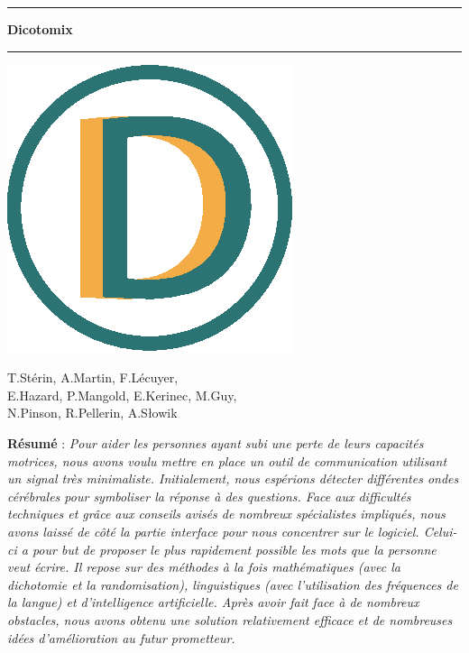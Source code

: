 \documentclass[11pt,a4paper]{article}
\theoremstyle{plain}
\theoremstyle{definition}
\begin{document}
\begin{center}


\vspace{1.5cm}

\rule[11pt]{5cm}{0.5pt}

\textbf{\huge Dicotomix}

\rule{5cm}{0.5pt}
\vspace{0.5cm}

\includegraphics[scale=0.7]{images/icon.eps}

\vspace{0.5cm}

T.Stérin, A.Martin, F.Lécuyer, \\ E.Hazard, P.Mangold, E.Kerinec, M.Guy, \\ N.Pinson, R.Pellerin, A.Słowik

\vspace{1.5cm}

\parbox{15cm}{\small
\textbf{Résumé} : \it Pour aider les personnes ayant subi une perte de leurs capacités motrices, nous avons voulu mettre en place un outil de communication utilisant un signal très minimaliste. Initialement, nous espérions détecter différentes ondes cérébrales pour symboliser la réponse à des questions. Face aux difficultés techniques et grâce aux conseils avisés de nombreux spécialistes impliqués, nous avons laissé de côté la partie interface pour nous concentrer sur le logiciel. Celui-ci a pour but de proposer le plus rapidement possible les mots que la personne veut écrire. Il repose sur des méthodes à la fois mathématiques (avec la dichotomie et la randomisation), linguistiques (avec l'utilisation des fréquences de la langue) et d'intelligence artificielle. Après avoir fait face à de nombreux obstacles, nous avons obtenu une solution relativement efficace et de nombreuses idées d'amélioration au futur prometteur.

}
\end{center}
\end{document}
